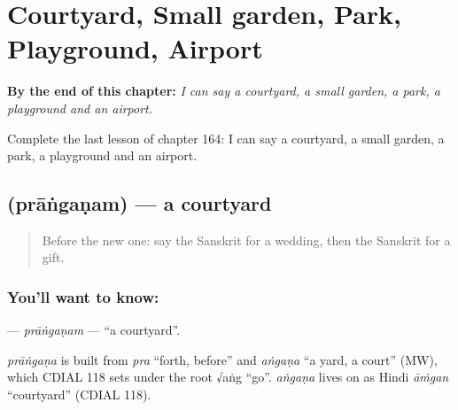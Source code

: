 
\chapter{Courtyard, Small garden, Park, Playground, Airport}
\label{ch:sa-courtyard-small-garden-park-playground-airport}

\begin{chapteropening}
\textbf{By the end of this chapter:} \emph{I can say a courtyard, a small garden, a park, a playground and an airport.}

Complete the last lesson of chapter 164: I can say a courtyard, a small garden, a park, a playground and an airport.
\end{chapteropening}

\section[\texorpdfstring{\sk{प्रांगणम्} (prāṅgaṇam)}{प्रांगणम् (prāṅgaṇam)}]{ (prāṅgaṇam) — a courtyard}

\label{lesson:SA-C164-pranganam}



\begin{quote}
Before the new one: say the Sanskrit for a wedding, then the Sanskrit for a gift.
\end{quote}

\subsection*{You'll want to know: }
\textbf{} — \emph{prāṅgaṇam} — \textquotedblleft{}a courtyard\textquotedblright{}.

\begin{cousinweb}
\emph{prāṅgaṇa} is built from \emph{pra} \textquotedblleft{}forth, before\textquotedblright{} and \emph{aṅgaṇa} \textquotedblleft{}a yard, a court\textquotedblright{} (MW), which CDIAL 118 sets under the root √aṅg \textquotedblleft{}go\textquotedblright{}. \emph{aṅgaṇa} lives on as Hindi \emph{āṁgan} \textquotedblleft{}courtyard\textquotedblright{} (CDIAL 118).
\end{cousinweb}

